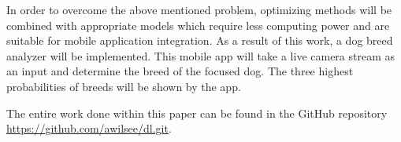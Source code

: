 In order to overcome the above mentioned problem, optimizing methods will be combined with appropriate models which require less computing power and are suitable for mobile application integration. As a result of this work, a dog breed analyzer will be implemented. This mobile app will take a live camera stream as an input and determine the breed of the focused dog. The three highest probabilities of breeds will be shown by the app.

The entire work done within this paper can be found in the GitHub repository \url{https://github.com/awilsee/dl.git}.